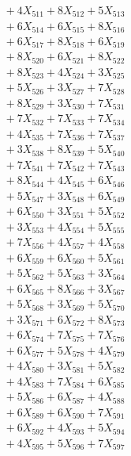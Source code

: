 \documentclass[a4paper,10pt]{article}
\begin{document}
{\begin{align}
&\;  + 4 X_{511} + 8 X_{512} + 5 X_{513} \\[0.3ex]
&\;  + 6 X_{514} + 6 X_{515} + 8 X_{516} \\[0.3ex]
&\;  + 6 X_{517} + 8 X_{518} + 6 X_{519} \\[0.5ex]\allowbreak
&\;  + 8 X_{520} + 6 X_{521} + 8 X_{522} \\[0.3ex]
&\;  + 8 X_{523} + 4 X_{524} + 3 X_{525} \\[0.3ex]
&\;  + 5 X_{526} + 3 X_{527} + 7 X_{528} \\[0.3ex]
&\;  + 8 X_{529} + 3 X_{530} + 7 X_{531} \\[0.3ex]
&\;  + 7 X_{532} + 7 X_{533} + 7 X_{534} \\[0.3ex]
&\;  + 4 X_{535} + 7 X_{536} + 7 X_{537} \\[0.3ex]
&\;  + 3 X_{538} + 8 X_{539} + 5 X_{540} \\[0.3ex]
&\;  + 7 X_{541} + 7 X_{542} + 7 X_{543} \\[0.3ex]
&\;  + 8 X_{544} + 4 X_{545} + 6 X_{546} \\[0.3ex]
&\;  + 5 X_{547} + 3 X_{548} + 6 X_{549} \\[0.5ex]\allowbreak
&\;  + 6 X_{550} + 3 X_{551} + 5 X_{552} \\[0.3ex]
&\;  + 3 X_{553} + 4 X_{554} + 5 X_{555} \\[0.3ex]
&\;  + 7 X_{556} + 4 X_{557} + 4 X_{558} \\[0.3ex]
&\;  + 6 X_{559} + 6 X_{560} + 5 X_{561} \\[0.3ex]
&\;  + 5 X_{562} + 5 X_{563} + 3 X_{564} \\[0.3ex]
&\;  + 6 X_{565} + 8 X_{566} + 3 X_{567} \\[0.3ex]
&\;  + 5 X_{568} + 3 X_{569} + 5 X_{570} \\[0.3ex]
&\;  + 3 X_{571} + 6 X_{572} + 8 X_{573} \\[0.3ex]
&\;  + 6 X_{574} + 7 X_{575} + 7 X_{576} \\[0.3ex]
&\;  + 6 X_{577} + 5 X_{578} + 4 X_{579} \\[0.5ex]\allowbreak
&\;  + 4 X_{580} + 3 X_{581} + 5 X_{582} \\[0.3ex]
&\;  + 4 X_{583} + 7 X_{584} + 6 X_{585} \\[0.3ex]
&\;  + 5 X_{586} + 6 X_{587} + 4 X_{588} \\[0.3ex]
&\;  + 6 X_{589} + 6 X_{590} + 7 X_{591} \\[0.3ex]
&\;  + 6 X_{592} + 4 X_{593} + 5 X_{594} \\[0.3ex]
&\;  + 4 X_{595} + 5 X_{596} + 7 X_{597} \\[0.3ex]

\end{align}}
\end{document}
